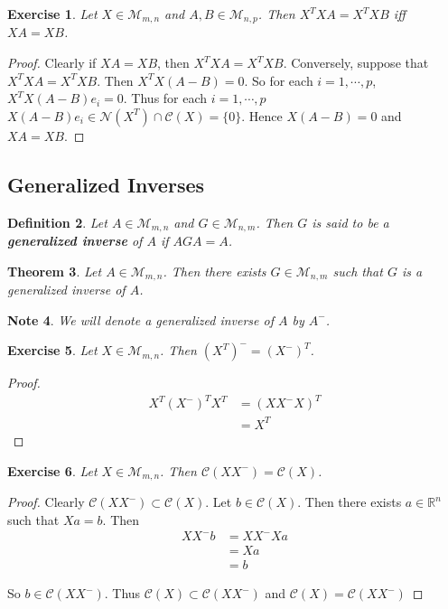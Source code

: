 \documentclass[12pt]{amsart}
\newtheorem{thm}{Theorem}[section]
\newtheorem{defn}[thm]{Definition}
\newtheorem{note}[thm]{Note}
\newtheorem{ex}[thm]{Exercise}
\newcommand{\R}{\mathbb{R}}
\newcommand{\MC}{\mathcal{C}}
\newcommand{\MN}{\mathcal{N}}
\newcommand{\MM}{\mathcal{M}}
\newcommand{\z}[1]{Let ${#1} \in \MM_{m,n}$}
\begin{document}
\begin{ex}
Let $X \in \MM_{m,n}$ and $A,B \in \MM_{n,p}$. Then $X^TXA = X^TXB$ iff $XA = XB$. 
\end{ex}

\begin{proof}
Clearly if $XA = XB$, then $X^TXA = X^TXB$. Conversely, suppose that $X^TXA = X^TXB$. Then $X^TX(A-B) = 0$. So for  each $i =1, \cdots, p$, $X^TX(A-B)e_i = 0$. Thus for each $i=1, \cdots, p$ $X(A-B)e_i \in \MN(X^T) \cap \MC(X) = \{0\}$. Hence $X(A-B) = 0$ and $XA = XB$. 
\end{proof}

\subsection{Generalized Inverses}

\begin{defn}
Let $A \in \MM_{m,n}$ and $G \in \MM_{n,m}$. Then $G$ is said to be a \textbf{generalized inverse} of $A$ if $AGA = A$. 
\end{defn}

\begin{thm}
Let $A \in \MM_{m,n}$. Then there exists $G \in \MM_{n,m}$ such that $G$ is a generalized inverse of $A$. 
\end{thm}

\begin{note}
We will denote a generalized inverse of $A$ by $A^-$.
\end{note}

\begin{ex}
\z{X}. Then $(X^T)^- = (X^-)^T$.
\end{ex}

\begin{proof}
\begin{align*}
X^T(X^-)^TX^T
&= (X X^- X)^T\\
&= X^T
\end{align*}
\end{proof}

\begin{ex}
\z{X}. Then $\MC(XX^-) = \MC(X)$. 
\end{ex}

\begin{proof}
Clearly $\MC(XX^-) \subset \MC(X)$. Let $b \in \MC(X)$. Then there exists $a \in \R^n$ such that $Xa = b$. Then 
\begin{align*}
XX^-b 
&= XX^-Xa \\
&= Xa \\
&= b
\end{align*}

So $b \in \MC(XX^-)$. Thus $\MC(X) \subset \MC(XX^-)$ and $\MC(X) = \MC(XX^-)$
\end{proof}
\end{document}

